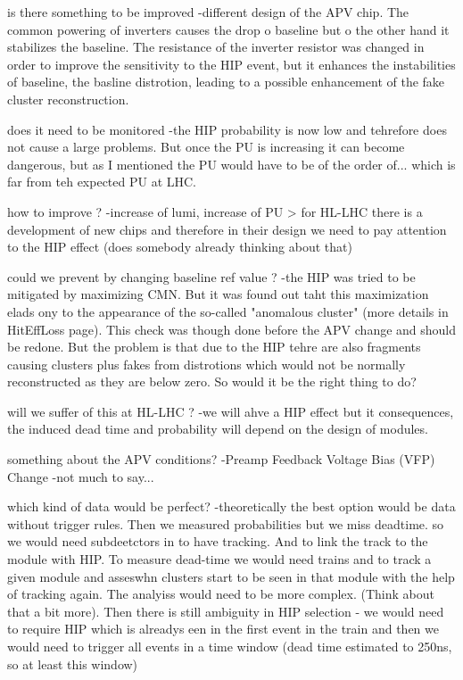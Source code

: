 is there something to be improved
	-different design of the APV chip. The common powering of inverters causes the drop o baseline but o the other hand it stabilizes the baseline. The resistance of the inverter resistor was changed in order to improve the sensitivity to the HIP event, but it enhances the instabilities of baseline, the basline distrotion, leading to a possible enhancement of the fake cluster reconstruction.

does it need to be monitored
	-the HIP probability is now low and tehrefore does not cause a large problems. But once the PU is increasing it can become dangerous, but as I mentioned the PU would have to be of the order of... which is far from teh expected PU at LHC.
 
how to improve ?
	-increase of lumi, increase of PU > for HL-LHC there is a development of new chips and therefore in their design we need to pay attention to the HIP effect (does somebody already thinking about that)

could we prevent by changing baseline ref value ?
	-the HIP was tried to be mitigated by maximizing CMN. But it was found out taht this maximization elads ony to the appearance of the so-called "anomalous cluster" (more details in HitEffLoss page). This check was though done before the APV change and should be redone. But the problem is that due to the HIP tehre are also fragments causing clusters plus fakes from distrotions which would not be normally reconstructed as they are below zero. So would it be the right thing to do?  %

will we suffer of this at HL-LHC ?
	-we will ahve a HIP effect but it consequences, the induced dead time and probability will depend on the design of modules.

something about the APV conditions?
	-Preamp Feedback Voltage Bias (VFP) Change
	-not much to say...

which kind of data would be perfect?
	-theoretically the best option would be data without trigger rules. Then we measured probabilities but we miss deadtime. so we would need subdeetctors in to have tracking. And to link the track to the module with HIP. To measure dead-time we would need trains and to track a given module and asseswhn clusters start to be seen in that module with the help of tracking again. The analyiss would need to be more complex. (Think about that a bit more). Then there is still ambiguity in HIP selection - we would need to require HIP which is alreadys een in the first event in the train and then we would need to trigger all events in a time window (dead time estimated to 250ns, so at least this window)

